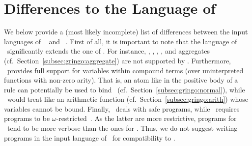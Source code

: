 \section{Differences to the Language of \lparse}\label{sec:lparse}

We below provide a (most likely incomplete) list of differences between the
input languages of \gringo~\cite{gescth07a} and \lparse~\cite{lparseManual}.
First of all, it is important to note that the language of \gringo\
significantly extends the one of \lparse.
For instance, 
, 
,
,
, and
aggregates (cf.\ Section~\ref{subsec:gringo:aggregate})
are not supported by \lparse.
Furthermore, \gringo\ provides full support for variables within compound terms
(over uninterpreted functions with non-zero arity).
That is, an atom like  in the positive body of a rule
can potentially be used to bind~\var{X} (cf.\ Section~\ref{subsec:gringo:normal}),
while \lparse\ would treat \code{\const{f}(\var{X})} like an arithmetic
function (cf.\ Section~\ref{subsec:gringo:arith}) whose variables cannot be bound.
Finally, \gringo\ deals with safe programs,
while \lparse\ requires programs to be $\omega$-restricted~\cite{syrjanen01a}.
As the latter are more restrictive,
programs for \lparse\ tend to be more verbose than the ones for \gringo.
Thus, we do not suggest writing programs in the input language of \gringo\
for compatibility to \lparse.

